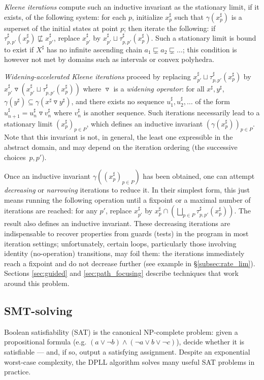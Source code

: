 \documentclass[preprint]{sigplanconf}
\newcommand{\abstr}[1]{#1^\sharp}
\newcommand{\widening}{\mathop{\triangledown}}
\begin{document}
\emph{Kleene iterations} compute such an inductive invariant as the stationary limit, if it exists, of the following system: for each $p$, initialize $\abstr{x}_p$ such that $\gamma(\abstr{x}_p)$ is a superset of the initial states at point $p$; then iterate the following:
if $\abstr{\tau}_{p,p'} (\abstr{x}_p) \nsqsubseteq \abstr{x}_{p'}$, replace $\abstr{x}_{p'}$ by $\abstr{x}_{p'} \sqcup \abstr{\tau}_{p,p'} (\abstr{x}_p)$.
Such a stationary limit is bound to exist if $\abstr{X}$ has no infinite ascending chain $a_1 \sqsubsetneq a_2 \sqsubsetneq \dots$; this condition is however not met by domains such as intervals or convex polyhedra.

\emph{Widening-accelerated Kleene iterations} proceed by replacing $\abstr{x}_{p'} \sqcup \abstr{\tau}_{p,p'} (\abstr{x}_p)$ by $\abstr{x}_{p'} \widening (\abstr{x}_{p'} \sqcup \abstr{\tau}_{p,p'} (\abstr{x}_p))$ where $\widening$ is a \emph{widening operator}: for all $\abstr{x},\abstr{y}$, $\gamma(\abstr{y}) \subseteq \gamma(\abstr{x} \widening \abstr{y})$, and there exists no sequence $\abstr{u}_1,\abstr{u}_2,\dots$ of the form $\abstr{u}_{n+1} = \abstr{u}_n \widening \abstr{v}_n$ where $\abstr{v}_n$ is another sequence.
Such iterations necessarily lead to a stationary limit $(\abstr{x}_p)_{p \in P}$, which defines an inductive invariant $(\gamma(\abstr{x}_p))_{p \in P}$. Note that this invariant is not, in general, the least one expressible in the abstract domain, and may depend on the iteration ordering (the successive choices~$p,p'$).

Once an inductive invariant $\gamma((\abstr{x}_p)_{p \in P})$ has been obtained, one can attempt \emph{decreasing} or \emph{narrowing} iterations to reduce it. In their simplest form, this just means running the following operation until a fixpoint or a maximal number of iterations are reached: for any $p'$, replace $\abstr{x}_{p'}$ by $\abstr{x}_p \cap \left(\bigsqcup_{p \in P} \abstr{\tau}_{p,p'} (\abstr{x}_p)\right)$. The result also defines an inductive invariant. These decreasing iterations are indispensable to recover properties from guards (tests) in the program in most iteration settings; unfortunately, certain loops, particularly those involving identity (no-operation) transitions, may foil them: the iterations immediately reach a fixpoint and do not decrease further (see example in \S\ref{subsec:rate_lim}). Sections \ref{sec:guided} and \ref{sec:path_focusing} describe techniques that work around this problem.

\subsection{SMT-solving}
Boolean satisfiability (SAT) is the canonical NP-complete problem: given a propositional formula (e.g. $(a \lor \neg b) \land (\neg a \lor b \lor \neg c)$), decide whether it is satisfiable --- and, if so, output a satisfying assignment.
Despite an exponential worst-case complexity, the DPLL algorithm \cite{Kroening_Strichman_08,Handbook_SAT} solves many useful SAT problems in practice.
\end{document}

